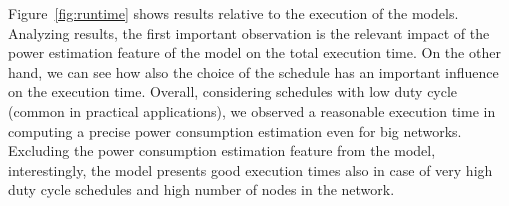 Figure~\ref{fig:runtime} shows results relative to the execution of the models.
Analyzing results, the first important observation is the relevant impact of the power estimation feature of the model on the total execution time.
On the other hand, we can see how also the choice of the schedule has an important influence on the execution time.
Overall, considering schedules with low duty cycle (common in practical applications), we observed a reasonable execution time in computing a precise power consumption estimation even for big networks.
Excluding the power consumption estimation feature from the model, interestingly, the model presents good execution times also in case of very high duty cycle schedules and high number of nodes in the network.
 



